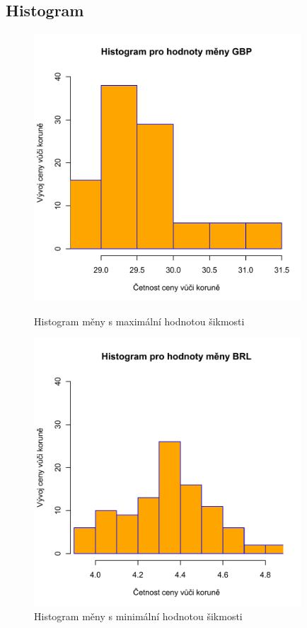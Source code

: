 \documentclass[a4paper]{ article}
\begin{document}
\subsection{Histogram}
\begin{figure}[H]
\centering
\includegraphics[width=10cm]{histogram_max.pdf}
\caption{Histogram měny s maximální hodnotou šikmosti}
\includegraphics[width=10cm]{histogram_min.pdf}
\caption{Histogram měny s minimální hodnotou šikmosti}
\end{figure}
\end{document}
